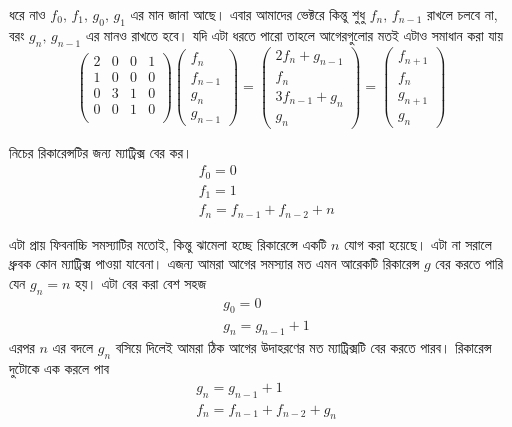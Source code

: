ধরে নাও $f_{0}, \, f_{1}, \, g_{0}, \, g_{1}$ এর মান জানা আছে। এবার আমাদের ভেক্টরে কিন্তু শুধু $f_{n}, \, f_{n - 1}$ রাখলে চলবে না, বরং $g_{n}, \, g_{n - 1}$ এর মানও রাখতে হবে। যদি এটা ধরতে পারো তাহলে আগেরগুলোর মতই এটাও সমাধান করা যায় 
$$
\begin{pmatrix}
2 & 0 & 0 & 1 \\
1 & 0 & 0 & 0 \\
0 & 3 & 1 & 0 \\
0 & 0 & 1 & 0 \\
\end{pmatrix} 
\begin{pmatrix}
f_{n} \\
f_{n - 1} \\ 
g_{n} \\
g_{n - 1}
\end{pmatrix}
= 
\begin{pmatrix}
2f_{n} + g_{n - 1}\\
f_{n} \\
3f_{n - 1} + g_{n} \\
g_{n} 
\end{pmatrix}
=
\begin{pmatrix}
f_{n + 1} \\
f_{n} \\
g_{n + 1} \\
g_{n}
\end{pmatrix}
$$ 

\begin{problem}
নিচের রিকারেন্সটির জন্য ম্যাট্রিক্স বের কর। 
\begin{align*}
& f_{0} = 0 \\
& f_{1} = 1 \\
& f_{n} = f_{n - 1} + f_{n - 2} + n
\end{align*}
\end{problem}
\begin{solution}
এটা প্রায় ফিবনাচ্চি সমস্যাটির মতোই, কিন্তু ঝামেলা হচ্ছে রিকারেন্সে একটি $n$ যোগ করা হয়েছে। এটা না সরালে ধ্রুবক কোন ম্যাট্রিক্স পাওয়া যাবেনা। এজন্য আমরা আগের সমস্যার মত এমন আরেকটি রিকারেন্স $g$ বের করতে পারি যেন $g_{n} = n$ হয়। এটা বের করা বেশ সহজ 
\begin{align*}
& g_{0} = 0 \\ 
& g_{n} = g_{n - 1} + 1
\end{align*}  
এরপর $n$ এর বদলে $g_{n}$ বসিয়ে দিলেই আমরা ঠিক আগের উদাহরণের মত ম্যাট্রিক্সটি বের করতে পারব। রিকারেন্স দুটোকে এক করলে পাব 
\begin{align*}
& g_{n} = g_{n - 1} + 1 \\
& f_{n} = f_{n - 1} + f_{n - 2} + g_{n} 
\end{align*} 
\end{solution}

